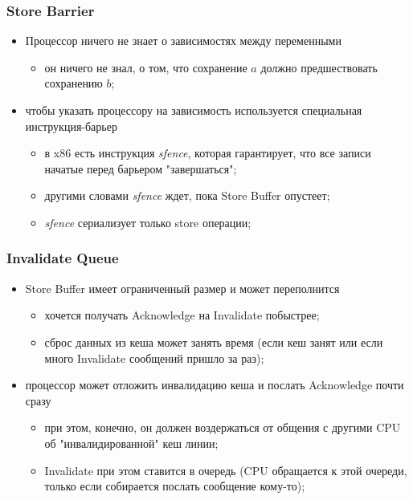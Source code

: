 \begin{frame}
\frametitle{Store Barrier}

\begin{itemize}
  \item Процессор ничего не знает о зависимостях между переменными
        \begin{itemize}
          \item он ничего не знал, о том, что сохранение $a$ должно
                предшествовать сохранению $b$;
        \end{itemize}
  \item чтобы указать процессору на зависимость используется специальная
        инструкция-барьер
        \begin{itemize}
          \item в x86 есть инструкция \emph{sfence}, которая гарантирует, что
                все записи начатые перед барьером "завершаться";
          \item другими словами \emph{sfence} ждет, пока Store Buffer опустеет;
          \item \emph{sfence} сериализует только store операции;
        \end{itemize}
\end{itemize}
\end{frame}

\begin{frame}
\frametitle{Invalidate Queue}

\begin{itemize}
  \item Store Buffer имеет ограниченный размер и может переполнится
        \begin{itemize}
          \item хочется получать Acknowledge на Invalidate побыстрее;
          \item сброс данных из кеша может занять время (если кеш занят или если
                много Invalidate сообщений пришло за раз);
        \end{itemize}
  \item процессор может отложить инвалидацию кеша и послать Acknowledge почти
        сразу
        \begin{itemize}
          \item при этом, конечно, он должен воздержаться от общения с другими
                CPU об "инвалидированной" кеш линии;
          \item Invalidate при этом ставится в очередь (CPU обращается к этой
                очереди, только если собирается послать сообщение кому-то);
        \end{itemize}
\end{itemize}
\end{frame}

